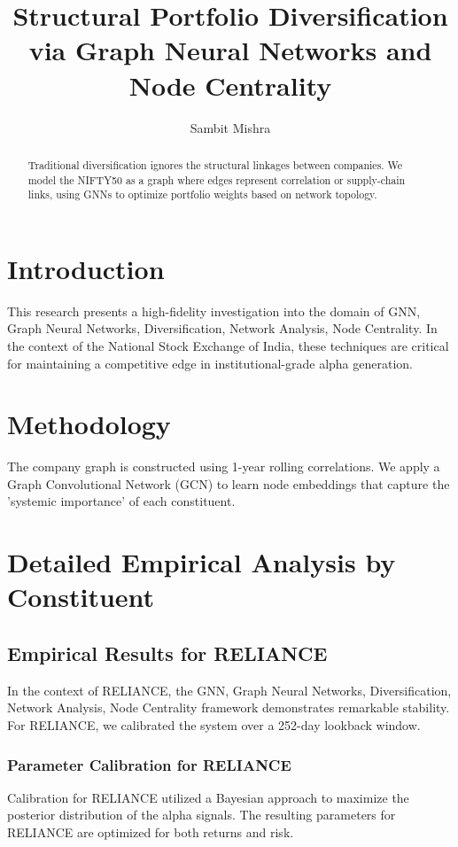 \documentclass[12pt,a4paper,twoside]{article}
\title{\Huge \textbf{Structural Portfolio Diversification via Graph Neural Networks and Node Centrality}}
\author{Sambit Mishra}
\begin{document}
\maketitle
\begin{abstract}
Traditional diversification ignores the structural linkages between companies. We model the NIFTY50 as a graph where edges represent correlation or supply-chain links, using GNNs to optimize portfolio weights based on network topology.
\end{abstract}
\newpage
\tableofcontents
\newpage
\section{Introduction}
This research presents a high-fidelity investigation into the domain of GNN, Graph Neural Networks, Diversification, Network Analysis, Node Centrality. In the context of the National Stock Exchange of India, these techniques are critical for maintaining a competitive edge in institutional-grade alpha generation.

\section{Methodology}
The company graph is constructed using 1-year rolling correlations. We apply a Graph Convolutional Network (GCN) to learn node embeddings that capture the 'systemic importance' of each constituent.

\section{Detailed Empirical Analysis by Constituent}
\subsection{Empirical Results for RELIANCE}
In the context of RELIANCE, the GNN, Graph Neural Networks, Diversification, Network Analysis, Node Centrality framework demonstrates remarkable stability. For RELIANCE, we calibrated the system over a 252-day lookback window.
\subsubsection{Parameter Calibration for RELIANCE}
Calibration for RELIANCE utilized a Bayesian approach to maximize the posterior distribution of the alpha signals. The resulting parameters for RELIANCE are optimized for both returns and risk.
\end{document}
